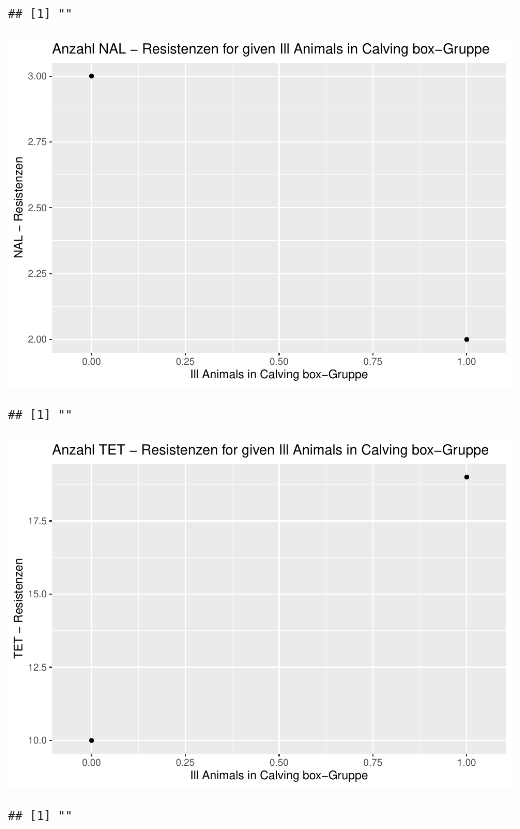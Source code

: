 \documentclass[
]{article}
\begin{document}
\begin{verbatim}
## [1] ""
\end{verbatim}

\includegraphics{NResistenzen_files/figure-latex/binary_or_nominal_variables-27.pdf}

\begin{verbatim}
## [1] ""
\end{verbatim}

\includegraphics{NResistenzen_files/figure-latex/binary_or_nominal_variables-28.pdf}

\begin{verbatim}
## [1] ""
\end{verbatim}
\end{document}
